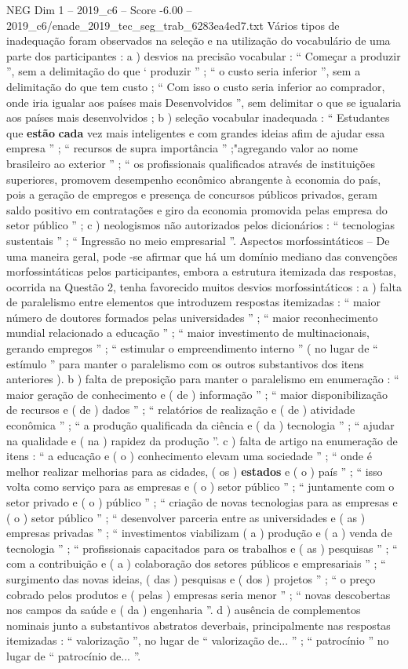 \begin{textsample}{NEG Dim 1 – 2019\_c6 – Score -6.00 – 2019\_c6/enade\_2019\_tec\_seg\_trab\_6283ea4ed7.txt}
Vários tipos de inadequação foram observados na seleção e na utilização do vocabulário de uma parte dos participantes : a ) desvios na precisão vocabular : “ Começar a produzir ”, sem a delimitação do que ‘ produzir ” ; “ o custo seria inferior ”, sem a delimitação do que tem custo ; “ Com isso o custo seria inferior ao comprador, onde iria igualar aos países mais Desenvolvidos ”, sem delimitar o que se igualaria aos países mais desenvolvidos ; b ) seleção vocabular inadequada : “ Estudantes que \textbf{estão} \textbf{cada} vez mais inteligentes e com grandes ideias afim de ajudar essa empresa ” ; “ recursos de supra importância ” ;"agregando valor ao nome brasileiro ao exterior ” ; “ os profissionais qualificados através de instituições superiores, promovem desempenho econômico abrangente à economia do país, pois a geração de empregos e presença de concursos públicos privados, geram saldo positivo em contratações e giro da economia promovida pelas empresa do setor público ” ; c ) neologismos não autorizados pelos dicionários : “ tecnologias sustentais ” ; “ Ingressão no meio empresarial ”.
Aspectos morfossintáticos – De uma maneira geral, pode -se afirmar que há um domínio mediano das convenções morfossintáticas pelos participantes, embora a estrutura itemizada das respostas, ocorrida na Questão 2, tenha favorecido muitos desvios morfossintáticos : a ) falta de paralelismo entre elementos que introduzem respostas itemizadas : “ maior número de doutores formados pelas universidades ” ; “ maior reconhecimento mundial relacionado a educação ” ; “ maior investimento de multinacionais, gerando empregos ” ; “ estimular o empreendimento interno ” ( no lugar de “ estímulo ” para manter o paralelismo com os outros substantivos dos itens anteriores ). b ) falta de preposição para manter o paralelismo em enumeração : “ maior geração de conhecimento e ( de ) informação ” ; “ maior disponibilização de recursos e ( de ) dados ” ; “ relatórios de realização e ( de ) atividade econômica ” ; “ a produção qualificada da ciência e ( da ) tecnologia ” ; “ ajudar na qualidade e ( na ) rapidez da produção ”. c ) falta de artigo na enumeração de itens : “ a educação e ( o ) conhecimento elevam uma sociedade ” ; “ onde é melhor realizar melhorias para as cidades, ( os ) \textbf{estados} e ( o ) país ” ; “ isso volta como serviço para as empresas e ( o ) setor público ” ; “ juntamente com o setor privado e ( o ) público ” ; “ criação de novas tecnologias para as empresas e ( o ) setor público ” ; “ desenvolver parceria entre as universidades e ( as ) empresas privadas ” ; “ investimentos viabilizam ( a ) produção e ( a ) venda de tecnologia ” ; “ profissionais capacitados para os trabalhos e ( as ) pesquisas ” ; “ com a contribuição e ( a ) colaboração dos setores públicos e empresariais ” ; “ surgimento das novas ideias, ( das ) pesquisas e ( dos ) projetos ” ; “ o preço cobrado pelos produtos e ( pelas ) empresas seria menor ” ; “ novas descobertas nos campos da saúde e ( da ) engenharia ”. d ) ausência de complementos nominais junto a substantivos abstratos deverbais, principalmente nas respostas itemizadas : “ valorização ”, no lugar de “ valorização de... ” ; “ patrocínio ” no lugar de “ patrocínio de... ”.

\end{textsample}
